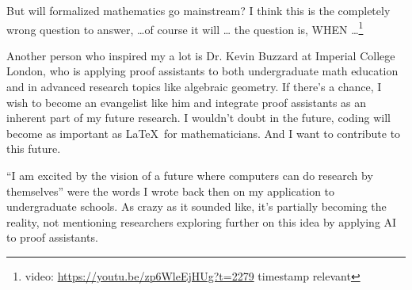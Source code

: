 \begin{displayquote}
    But will formalized mathematics go mainstream?
    I think this is the completely wrong question to answer, \ldots of course it will \ldots
    the question is, WHEN \ldots \footnote{video: \url{https://youtu.be/zp6WleEjHUg?t=2279} timestamp relevant}
\end{displayquote}

Another person who inspired my a lot is Dr. Kevin Buzzard at Imperial College London,
who is applying proof assistants to both undergraduate math education and in advanced research topics like algebraic geometry.
If there's a chance,
I wish to become an evangelist like him and integrate proof assistants as an inherent part of my future research.
I wouldn't doubt in the future, coding will become as important as \LaTeX\ for mathematicians.
And I want to contribute to this future.

``I am excited by the vision of a future where computers can do research by themselves''
were the words I wrote back then on my application to undergraduate schools.
As crazy as it sounded like, it's partially becoming the reality,
not mentioning researchers exploring further on this idea by applying AI to proof assistants.
